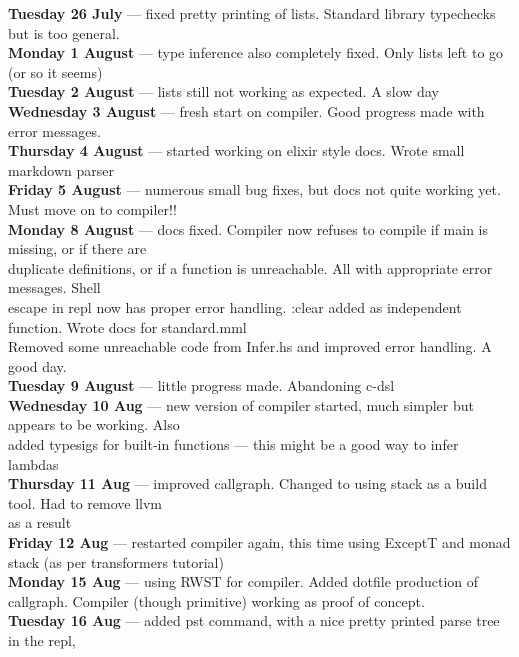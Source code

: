 \textbf{Tuesday 26 July}  --- fixed pretty printing of lists. Standard library typechecks but is too general. \\
\textbf{Monday 1 August}  --- type inference also completely fixed. Only lists left to go (or so it seems) \\
\textbf{Tuesday 2 August}  --- lists still not working as expected. A slow day \\
\textbf{Wednesday 3 August}  --- fresh start on compiler. Good progress made with error messages. \\
\textbf{Thursday 4 August}  --- started working on elixir style docs. Wrote small markdown parser \\
\textbf{Friday 5 August}  --- numerous small bug fixes, but docs not quite working yet. Must move on to compiler!! \\
\textbf{Monday 8 August}  --- docs fixed. Compiler now refuses to compile if main is missing, or if there are \\
                    duplicate definitions, or if a function is unreachable. All with appropriate error messages. Shell \\
                    escape in repl now has proper error handling. :clear added as independent function. Wrote docs for standard.mml \\
                    Removed some unreachable code from Infer.hs and improved error handling. A good day. \\
\textbf{Tuesday 9 August}  --- little progress made. Abandoning c-dsl \\
\textbf{Wednesday 10 Aug}  --- new version of compiler started, much simpler but appears to be working. Also \\
                   added typesigs for built-in functions  --- this might be a good way to infer lambdas \\
\textbf{Thursday 11 Aug}  --- improved callgraph. Changed to using stack as a build tool. Had to remove llvm \\
                     as a result \\
\textbf{Friday 12 Aug}  --- restarted compiler again, this time using ExceptT and monad stack (as per transformers tutorial) \\
\textbf{Monday 15 Aug}  --- using RWST for compiler. Added dotfile production of callgraph. Compiler (though primitive) working as proof of concept. \\
\textbf{Tuesday 16 Aug}  --- added pst command, with a nice pretty printed parse tree in the repl,
